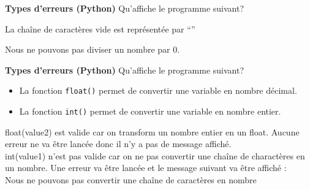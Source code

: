 \begin{Exercice}[5 minutes] \textbf{Types d'erreurs (Python)} Qu'affiche le programme suivant?\\
    
    
     \begin{conseil}
         La chaîne de caractères vide est représentée par ``'' 
    \end{conseil}
     \begin{solution}
        Nous ne pouvons pas diviser un nombre par 0.
     \end{solution}   
 \end{Exercice}

 \begin{Exercice}[5 minutes] \textbf{Types d'erreurs (Python)} Qu'affiche le programme suivant? \\
    
    
     \begin{conseil}
        \begin{itemize}
            \item La fonction \lstinline{float()} permet de convertir une variable en nombre décimal.
            \item La fonction \lstinline{int()} permet de convertir une variable en nombre entier.
        \end{itemize}  
    \end{conseil}

     \begin{solution}
        float(value2) est valide car on transform un nombre entier en un float. Aucune erreur ne va être lancée donc il n'y a pas de message affiché.\\
        int(value1) n'est pas valide car on ne pas convertir une chaîne de charactères en un nombre. Une erreur va être lancée et le message suivant va être affiché :\\
        Nous ne pouvons pas convertir une chaîne de caractères en nombre
     \end{solution}

\end{Exercice}
 

